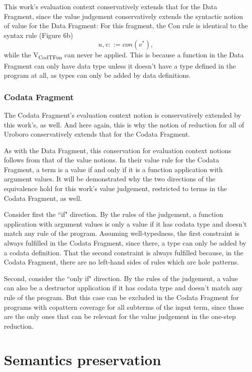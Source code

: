 \documentclass[11pt]{article} %
\begin{document}
This work's evaluation context conservatively extends that for the Data Fragment, since the value judgement conservatively extends the syntactic notion of value for the Data Fragment: For this fragment, the Con rule is identical to the syntax rule (Figure 6b)
\begin{equation*}
u, v ::= con(v^*),
\end{equation*}
while the V\textsubscript{CodTFun} can never be applied. This is because a function in the Data Fragment can only have data type unless it doesn't have a type defined in the program at all, as types can only be added by data definitions.

\subsubsection{Codata Fragment}

The Codata Fragment's evaluation context notion is conservatively extended by this work's, as well. And here again, this is why the notion of reduction for all of Uroboro conservatively extends that for the Codata Fragment.

As with the Data Fragment, this conservation for evaluation context notions follows from that of the value notions. In their value rule for the Codata Fragment, a term is a value if and only if it is a function application with argument values. It will be demonstrated why the two directions of the equivalence hold for this work's value judgement, restricted to terms in the Codata Fragment, as well.

Consider first the ``if" direction. By the rules of the judgement, a function application with argument values is only a value if it has codata type and doesn't match any rule of the program. Assuming well-typedness, the first constraint is always fulfilled in the Codata Fragment, since there, a type can only be added by a codata definition. That the second constraint is always fulfilled because, in the Codata Fragment, there are no left-hand sides of rules which are hole patterns.

Second, consider the ``only if" direction. By the rules of the judgement, a value can also be a destructor application if it has codata type and doesn't match any rule of the program. But this case can be excluded in the Codata Fragment for programs with copattern coverage for all subterms of the input term, since those are the only ones that can be relevant for the value judgement in the one-step reduction.

\section{Semantics preservation}
\end{document}
